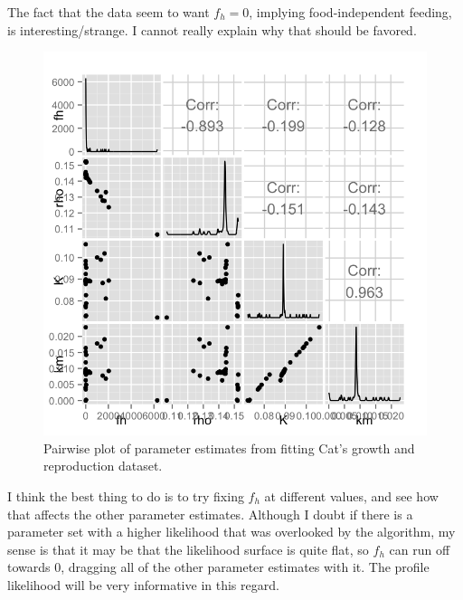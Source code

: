 \documentclass[12pt,reqno,final,pdftex]{amsart}\usepackage[]{graphicx}\usepackage[]{color}
\newenvironment{knitrout}{}{} %
\theoremstyle{plain}
\numberwithin{equation}{part}
\begin{document}
The fact that the data seem to want $f_h=0$, implying food-independent feeding, is interesting/strange.
I cannot really explain why that should be favored.
\begin{knitrout}\scriptsize
{}\color{fgcolor}\begin{figure}

\includegraphics[width=\linewidth]{figure/Cat-fits-1-1} \hfill{}

\caption[Pairwise plot of parameter estimates from fitting Cat's growth and reproduction dataset]{Pairwise plot of parameter estimates from fitting Cat's growth and reproduction dataset.}\label{fig:Cat-fits-1}
\end{figure}


\end{knitrout}

I think the best thing to do is to try fixing $f_h$ at different values, and see how that affects the other parameter estimates.
Although I doubt if there is a parameter set with a higher likelihood that was overlooked by the algorithm, my sense is that it may be that the likelihood surface is quite flat, so $f_h$ can run off towards 0, dragging all of the other parameter estimates with it.
The profile likelihood will be very informative in this regard.
\end{document}
